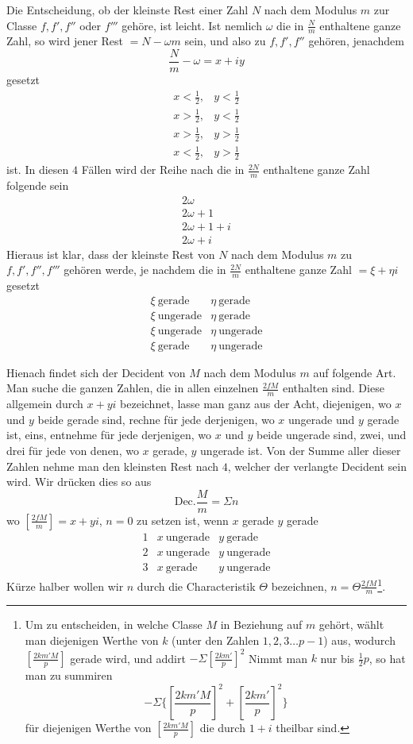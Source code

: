 Die Entscheidung, ob der kleinste Rest einer Zahl $N$ nach dem Modulus $m$ zur Classe $f,f',f''$ oder $f'''$ gehöre, ist leicht. Ist nemlich $\omega$ die in $\frac{N}{m}$ enthaltene ganze Zahl, so wird jener Rest $=N-\omega m$ sein, und also zu $f,f',f''$ gehören, jenachdem
\[
\frac{N}{m}-\omega=x+iy
\]
gesetzt
\[
\begin{array}{ll}
x<\tfrac12,&y<\tfrac12\\
x>\tfrac12,&y<\tfrac12\\
x>\tfrac12,&y>\tfrac12\\
x<\tfrac12,&y>\tfrac12
\end{array}
\]
ist. In diesen $4$ Fällen wird der Reihe nach die in $\frac{2N}{m}$ enthaltene ganze Zahl folgende sein
\[
\begin{array}{l}
2\omega\\
2\omega+1\\
2\omega+1+i\\
2\omega+i
\end{array}
\]
Hieraus ist klar, dass der kleinste Rest von $N$ nach dem Modulus $m$ zu $f,f',f'',f'''$ gehören werde, je nachdem die in $\frac{2N}{m}$ enthaltene ganze Zahl $=\xi+\eta i$ gesetzt
\[
\begin{array}{ll}
\xi\ \text{gerade}&\eta\ \text{gerade}\\
\xi\ \text{ungerade}&\eta\ \text{gerade}\\
\xi\ \text{ungerade}&\eta\ \text{ungerade}\\
\xi\ \text{gerade}&\eta\ \text{ungerade}
\end{array}
\]

Hienach findet sich der Decident von $M$ nach dem Modulus $m$ auf folgende Art. Man suche die ganzen Zahlen, die in allen einzelnen $\frac{2fM}{m}$ enthalten sind. Diese allgemein durch $x+yi$ bezeichnet, lasse man ganz aus der Acht, diejenigen, wo $x$ und $y$ beide gerade sind, rechne für jede derjenigen, wo $x$ ungerade und $y$ gerade ist, eins, entnehme für jede derjenigen, wo $x$ und $y$ beide ungerade sind, zwei, und drei für jede von denen, wo $x$ gerade, $y$ ungerade ist. Von der Summe aller dieser Zahlen nehme man den kleinsten Rest nach $4$, welcher der verlangte Decident sein wird. Wir drücken dies so aus
\[
\mathrm{Dec.}\frac{M}{m}=\Sigma n
\]
wo $[\frac{2fM}{m}]=x+yi$, $n=0$ zu setzen ist, wenn $x$ gerade $y$ gerade
\[
\begin{array}{cll}
1&x\ \text{ungerade}&y\ \text{gerade}\\
2&x\ \text{ungerade}&y\ \text{ungerade}\\
3&x\ \text{gerade}&y\ \text{ungerade}
\end{array}
\]
Kürze halber wollen wir $n$ durch die Characteristik $\Theta$ bezeichnen, $n=\Theta\frac{2fM}{m}$\begingroup\renewcommand{\thefootnote}{*)}\footnote{Um zu entscheiden, in welche Classe $M$ in Beziehung auf $m$ gehört, wählt man diejenigen Werthe von $k$ (unter den Zahlen $1,2,3\ldots p-1$) aus, wodurch $[\frac{2km'M}{p}]$ gerade wird, und addirt $-\Sigma[\frac{2km'}{p}]^2$ Nimmt man $k$ nur bis $\frac12p$, so hat man zu summiren
\[
-\Sigma\{[\frac{2km'M}{p}]^2+[\frac{2km'}{p}]^2\}
\]
für diejenigen Werthe von $[\frac{2km'M}{p}]$ die durch $1+i$ theilbar sind.}\endgroup.
